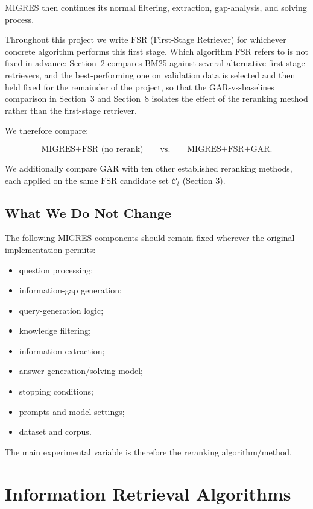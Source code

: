 \documentclass[11pt,a4paper]{article}
\begin{document}
MIGRES then continues its normal filtering, extraction, gap-analysis, and solving process.

Throughout this project we write $\mathrm{FSR}$ (First-Stage Retriever) for whichever concrete algorithm performs this first stage. Which algorithm $\mathrm{FSR}$ refers to is not fixed in advance: Section~2 compares BM25 against several alternative first-stage retrievers, and the best-performing one on validation data is selected and then held fixed for the remainder of the project, so that the GAR-vs-baselines comparison in Section~3 and Section~8 isolates the effect of the reranking method rather than the first-stage retriever.

We therefore compare:

\[
\boxed{\text{MIGRES+FSR (no rerank)}}
\qquad\text{vs.}\qquad
\boxed{\text{MIGRES+FSR+GAR}}.
\]

We additionally compare GAR with ten other established reranking methods, each applied on the same $\mathrm{FSR}$ candidate set $\mathcal{C}_t$ (Section 3).

\subsection{What We Do Not Change}

The following MIGRES components should remain fixed wherever the original implementation permits:

\begin{itemize}[leftmargin=1.5em]
\item question processing;
\item information-gap generation;
\item query-generation logic;
\item knowledge filtering;
\item information extraction;
\item answer-generation/solving model;
\item stopping conditions;
\item prompts and model settings;
\item dataset and corpus.
\end{itemize}

The main experimental variable is therefore the reranking algorithm/method.

\section{Information Retrieval Algorithms}
\end{document}
